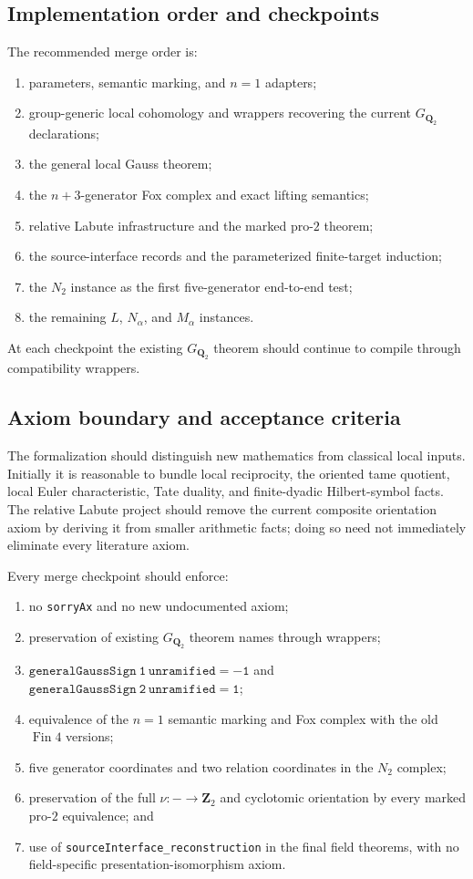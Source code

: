 \documentclass[11pt,reqno]{amsart}
\theoremstyle{definition}
\theoremstyle{remark}
\numberwithin{equation}{section}
\newcommand{\Q}{\mathbf Q}
\newcommand{\Z}{\mathbf Z}
\begin{document}
\subsection{Implementation order and checkpoints}

The recommended merge order is:
\begin{enumerate}
\item parameters, semantic marking, and \(n=1\) adapters;
\item group-generic local cohomology and wrappers recovering the current
\(G_{\Q_2}\) declarations;
\item the general local Gauss theorem;
\item the \(n+3\)-generator Fox complex and exact lifting semantics;
\item relative Labute infrastructure and the marked pro-\(2\) theorem;
\item the source-interface records and the parameterized finite-target
induction;
\item the \(N_2\) instance as the first five-generator end-to-end test;
\item the remaining \(L\), \(N_\alpha\), and \(M_\alpha\) instances.
\end{enumerate}
At each checkpoint the existing \(G_{\Q_2}\) theorem should continue to
compile through compatibility wrappers.

\subsection{Axiom boundary and acceptance criteria}

The formalization should distinguish new mathematics from classical local
inputs.  Initially it is reasonable to bundle local reciprocity, the
oriented tame quotient, local Euler characteristic, Tate duality, and
finite-dyadic Hilbert-symbol facts.  The relative Labute project should
remove the current composite orientation axiom by deriving it from smaller
arithmetic facts; doing so need not immediately eliminate every
literature axiom.

Every merge checkpoint should enforce:
\begin{enumerate}
\item no \texttt{sorryAx} and no new undocumented axiom;
\item preservation of existing \(G_{\Q_2}\) theorem names through wrappers;
\item
\(\mathtt{generalGaussSign\ 1\ unramified=-1}\) and
\(\mathtt{generalGaussSign\ 2\ unramified=1}\);
\item equivalence of the \(n=1\) semantic marking and Fox complex with the
old \(\operatorname{Fin}4\) versions;
\item five generator coordinates and two relation coordinates in the
\(N_2\) complex;
\item preservation of the full \(\nu:\!-\to\Z_2\) and cyclotomic
orientation by every marked pro-\(2\) equivalence; and
\item use of \texttt{sourceInterface\_reconstruction} in the final field
theorems, with no field-specific presentation-isomorphism axiom.
\end{enumerate}
\end{document}
